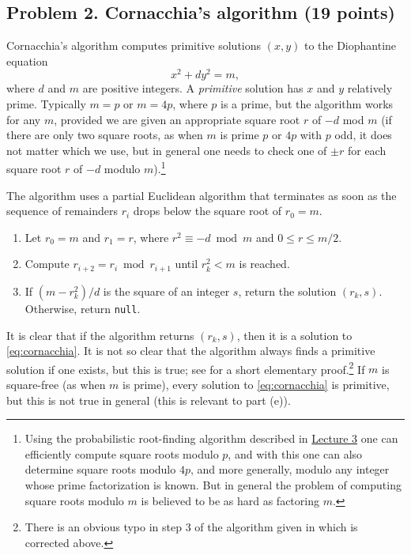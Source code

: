 \documentclass[11pt]{article}
\begin{document}
\subsection*{Problem 2. Cornacchia's algorithm (19 points)}
Cornacchia's algorithm computes primitive solutions $(x,y)$ to the Diophantine equation
\begin{equation}\label{eq:cornacchia}
x^2+dy^2 = m,
\end{equation}
where $d$ and $m$ are positive integers.  A \emph{primitive} solution has $x$ and $y$ relatively prime.
Typically $m=p$ or $m=4p$, where $p$ is a prime, but the algorithm works for any $m$, provided we are given an appropriate square root $r$ of $-d$ mod $m$ (if there are only two square roots, as when $m$ is prime $p$ or $4p$ with $p$ odd, it does not matter which we use, but in general one needs to check one of $\pm r$ for each square root $r$ of $-d$ modulo $m$).\footnote{Using the probabilistic root-finding algorithm described in \href{https://math.mit.edu/classes/18.783/2021/LectureNotes3.pdf}{Lecture 3} one can efficiently compute square roots modulo $p$, and with this one can also determine square roots modulo $4p$, and more generally, modulo any integer whose prime factorization is known.  But in general the problem of computing square roots modulo $m$ is believed to be as hard as factoring $m$.}



The algorithm uses a partial Euclidean algorithm that terminates as soon as the sequence of remainders $r_i$ drops below the square root of $r_0=m$.
\begin{enumerate}[1.]
\item
Let $r_0 = m$ and $r_1 = r$, where $r^2\equiv -d \bmod m$ and $0\le r\le m/2$.
\item
Compute $r_{i+2} = r_i \bmod r_{i+1}$ until $r_k^2 < m$ is reached.
\item
If $(m-r_k^2)/d$ is the square of an integer $s$, return the solution $(r_k,s)$.\\
Otherwise, return \texttt{null}.
\end{enumerate}

It is clear that if the algorithm returns $(r_k,s)$, then it is a solution to \eqref{eq:cornacchia}.
It is not so clear that the algorithm always finds a primitive solution if one exists, but this is true; see \cite{basilla} for a
short elementary proof.\footnote{There is an obvious typo in step 3 of the algorithm given in \cite{basilla} which is corrected above.}
If $m$ is square-free (as when $m$ is prime), every solution to \eqref{eq:cornacchia} is primitive, but this is not true in general (this is relevant to part (e)).
\end{document}
